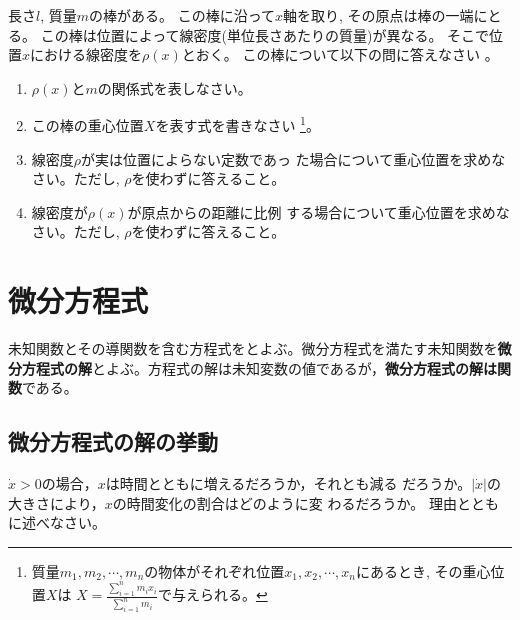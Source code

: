 \documentclass[twocolumn,11pt]{jarticle}
\begin{document}
\nquestion
長さ$l$, 質量$m$の棒がある。
この棒に沿って$x$軸を取り, その原点は棒の一端にとる。
この棒は位置によって線密度(単位長さあたりの質量)が異なる。
そこで位置$x$における線密度を$\rho(x)$とおく。
この棒について以下の問に答えなさい
。
\begin{enumerate}
\item\label{item:stick-m} $\rho(x)$と$m$の関係式を表しなさい。
\item\label{item:stick-com} この棒の重心位置$X$を表す式を書きなさい
  \footnote{質量$m_1, m_2, \cdots, m_n$の物体がそれぞれ位置$x_1, x_2,
    \cdots, x_n$にあるとき,
    その重心位置$X$は
    $\displaystyle X=\frac{\displaystyle\sum_{i=1}^nm_ix_i}{\displaystyle\sum_{i=1}^nm_i}$で与えられる。
  }。
\item\label{item:stick-com-1} 線密度$\rho$が実は位置によらない定数であっ
  た場合について重心位置を求めなさい。ただし, $\rho$を使わずに答えること。
\item\label{item:stick-com-2} 線密度が$\rho(x)$が原点からの距離に比例
  する場合について重心位置を求めなさい。ただし, $\rho$を使わずに答えること。
\end{enumerate}

\newpage
\section{微分方程式}

未知関数とその導関数を含む方程式をとよぶ。微分方程式を満たす未知関数を\textbf{微分方程式の解}とよぶ。方程式の解は未知変数の値であるが，\textbf{微分方程式の解は関数}である。

\subsection{微分方程式の解の挙動}
\nquestion
$\dot{x}>0$の場合，$x$は時間とともに増えるだろうか，それとも減る
だろうか。$|\dot{x}|$の大きさにより，$x$の時間変化の割合はどのように変
わるだろうか。
理由とともに述べなさい。
\end{document}
